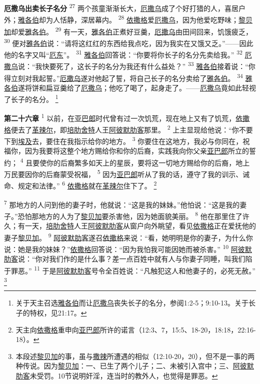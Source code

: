 \textbf{厄撒乌出卖长子名分\quad}
\textsuperscript{27}
两个孩童渐渐长大，\uline{厄撒乌}成了个好打猎的人，喜居户外；\uline{雅各伯}却为人恬静，深居幕内。
\textsuperscript{28}
\uline{依撒格}爱\uline{厄撒乌}，因为他爱吃野味；\uline{黎贝加}却爱\uline{雅各伯}。
\textsuperscript{29}
有一天，\uline{雅各伯}正煮好豆羹，\uline{厄撒乌}由田间回来，饥饿疲乏，
\textsuperscript{30}
便对\uline{雅各伯}说：“请将这红红的东西给我点吃，因为我实在又饿又乏。”——因此他的名字又叫“\uline{厄东}”。
\textsuperscript{31}
\uline{雅各伯}回答说：“你要将你长子的名分先卖给我。”
\textsuperscript{32}
\uline{厄撒乌}说：“我快要死了，这长子的名分为我还有什么益处？”
\textsuperscript{33}
\uline{雅各伯}接着说：“你得立刻对我起誓。”\uline{厄撒乌}遂对他起了誓，将自己长子的名分卖给了\uline{雅各伯}。
\textsuperscript{34}
\uline{雅各伯}遂将饼和扁豆羹给了\uline{厄撒乌}；他吃了喝了，起身走了。——\uline{厄撒乌}竟如此轻视了长子的名分。
\footnote{关于天主召选\uline{雅各伯}而让\uline{厄撒乌}丧失长子的名分，参阅1:2-5；9:10-13。关于长子的特权，见21:17。}

\textbf{第二十六章\quad}
\textsuperscript{1}
以前，在\uline{亚巴郎}时代曾有过一次饥荒，现在地上又有了饥荒，\uline{依撒格}便去了\uline{革辣尔}，即\uline{培肋}\uline{舍特}人王\uline{阿彼默}\uline{肋客}那里。
\textsuperscript{2}
上主显现给他说：“你不要下到\uline{埃及}去，要住在我指示给你的地方。
\textsuperscript{3}
你要住在这地方，我必与你同在，祝福你，因为我要将这整个地方赐给你和你的后裔，实践我向你父亲\uline{亚巴郎}所立的誓约；
\textsuperscript{4}
且要使你的后裔繁多如天上的星辰，要将这一切地方赐给你的后裔，地上万民要因你的后裔蒙受祝福，
\textsuperscript{5}
因为\uline{亚巴郎}听从了我的话，遵守了我的训示、诫命、规定和法律。”
\textsuperscript{6}
\uline{依撒格}就在\uline{革辣尔}住下了。
\footnote{天主向\uline{依撒格}重申向\uline{亚巴郎}所许的诺言（12:3、7，15:5、18-20，18:18，22:16-18）。}

\textsuperscript{7}
那地方的人问到他的妻子时，他就说：“这是我的妹妹。”他怕说：“这是我的妻子。”恐怕那地方的人为了\uline{黎贝加}要杀害他，因为她面貌美丽。
\textsuperscript{8}
他在那里住了许久；有一天，\uline{培肋}\uline{舍特}人王\uline{阿彼默}\uline{肋客}从窗户向外眺望，看见\uline{依撒格}正在爱抚他的妻子\uline{黎贝加}。
\textsuperscript{9}
\uline{阿彼默}\uline{肋客}遂召\uline{依撒格}来说：“看，她明明是你的妻子，为什么你说：她是我的妹妹？”\uline{依撒格}回答说：“因为我怕我可能因她而被杀害。”
\textsuperscript{10}
\uline{阿彼默}\uline{肋客}说：“你对我们作的是什么事？差一点百姓中就有人与你妻子同睡，叫我们陷于罪恶。”
\textsuperscript{11}
于是\uline{阿彼默}\uline{肋客}号令全百姓说：“凡触犯这人和他妻子的，必死无赦。”
\footnote{本段述\uline{黎贝加}的事，虽与\uline{撒辣}所遭遇的相似（12:10-20，20），但不是一事的两种传说。因为\uline{黎贝加}：一、已生了两个儿子；二、未被引入宫中；三、\uline{阿彼默}\uline{肋客}未受罚。10节说明奸淫，连当时的教外人，也觉得是罪恶。}

